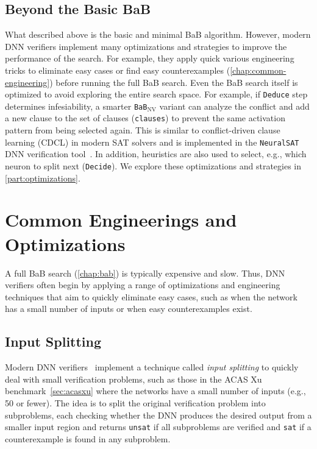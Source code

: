 \documentclass[oneside,11pt,dvipsnames]{book}
\numberwithin{equation}{section}
\theoremstyle{definition}
\theoremstyle{remark}
\newcommand{\functiontextformat}[1]{\textrm{\texttt{#1}}}
\newcommand{\tvn}[1]{\iftoggle{usecomment}{{\color{red}{[TVN]: #1}}}{}}
\newcommand{\prooflang}{\texttt{BaB$_{\text{ProofLang}}$}}
\newcommand{\bab}{\texttt{BaB$_{\text{NV}}$}}
\newcommand{\neuralsat}{\texttt{NeuralSAT}}
\newcommand{\sat}{\texttt{sat}}
\newcommand{\unsat}{\texttt{unsat}}
\begin{document}
\section{Beyond the Basic BaB} What described above is the basic and minimal BaB algorithm. However, modern DNN verifiers implement many optimizations and strategies to improve the performance of the search. For example, they apply quick various engineering tricks to eliminate easy cases or find easy counterexamples (\autoref{chap:common-engineering}) before running the full BaB search. Even the BaB search itself is optimized to avoid exploring the entire search space. For example, if \functiontextformat{Deduce} step determines infesiability, a smarter \bab{} variant can analyze the conflict and add a new clause to the set of clauses (\texttt{clauses}) to prevent the same activation pattern from being selected again. This is similar to conflict-driven clause learning (CDCL) in modern SAT solvers and is implemented in the \neuralsat{} DNN verification tool~\cite{duong2025neuralsat}. In addition, heuristics are also used to select, e.g., which neuron to split next (\functiontextformat{Decide}). We explore these optimizations and strategies in \autoref{part:optimizations}.





\chapter{Common Engineerings and Optimizations}\label{chap:common-engineering}

A full BaB search (\autoref{chap:bab}) is typically expensive and slow. Thus, DNN verifiers often begin by applying a range of optimizations and engineering techniques that aim to quickly eliminate easy cases, such as when the network has a small number of inputs or when easy counterexamples exist.

\section{Input Splitting} Modern DNN verifiers~\cite{katz2019marabou,katz2022reluplex,bak2021nnenum,duong2025neuralsat} implement a technique called \emph{input splitting} to quickly deal with small verification problems, such as those in the ACAS Xu benchmark~\autoref{sec:acasxu} where the networks have a small number of inputs (e.g., 50 or fewer). The idea is to split the original verification problem into subproblems, each checking whether the DNN produces the desired output from a smaller input region and returns \unsat{} if all subproblems are verified and \sat{} if a counterexample is found in any subproblem.\tvn{Hai, check and give a small example of input splitting. Perhaps use some existing example.}
\end{document}
